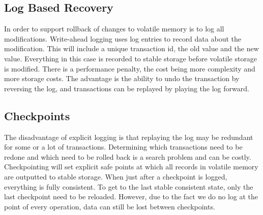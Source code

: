 \documentclass[10pt,a4paper]{article}
\begin{document}
\subsection{Log Based Recovery}
In order to support rollback  of changes to volatile memory is to log all modifications. Write-ahead logging uses log entries to record data about the modification. This will include a unique transaction id, the old value and the new value. Everything in this case is recorded to stable storage before volatile storage is modified. There is a performance penalty, the cost being more complexity and more storage costs. The advantage is the ability to undo the transaction by reversing the log, and transactions can be replayed  by playing the log forward. 
\subsection{Checkpoints}
The disadvantage of explicit logging is that replaying the log may be redundant for some or a lot of transactions. Determining which transactions need to be redone and which need to be rolled back is a search problem and can be costly. Checkpointing will set explicit safe points at which all records in volatile memory are outputted to stable storage. When just after a checkpoint is logged, everything is fully consistent. To get to the last stable consistent state, only the last checkpoint need to be reloaded. However, due to the fact we do no log at the point of every operation, data can still be lost between checkpoints. 
\end{document}

